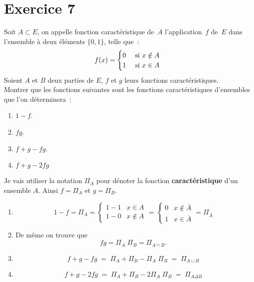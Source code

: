 \documentclass{report}
\begin{document}
\section{Exercice 7}
\qs{}
{

Soit $A\subset E$, on appelle fonction caractéristique de~$A$
l'application~$f$ de~$E$ dans l'ensemble à deux éléments $\{0, 1\}$, telle
que~:
$$f(x)=\begin{cases}
0&  \text{ si } x\notin A \cr 1& \text{ si } x \in A \cr
\end{cases}$$
Soient $A$ et $B$ deux parties de $E$, $f$ et $g$ leurs fonctions
caractéristiques.\\
Montrer que les fonctions suivantes sont les fonctions
caractéristiques d'ensembles que l'on déterminera~:
\begin{enumerate}
\item $1-f$.
\item $fg$.
\item $f+g-fg$.
\item $f + g - 2fg$
\end{enumerate}

}
\begin{myproof}
  
  Je vais utiliser la notation $\varPi_A$ pour dénoter la fonction
  \textbf{caractéristique} d'un ensemble $A$. Ainsi $f=\varPi_A$ et $g=\varPi_B$.
  \begin{enumerate}
      \item 
      $$
     1 - f = \varPi_A = \begin{cases}
      1 - 1 & x \in A   \\
      1 - 0 & x \not\in A
    \end{cases} = 
\begin{cases}
  0 & x \notin \overline{A}   \\
  1  & x \in \overline{A}
\end{cases} = \varPi_{\overline{A}}
      $$
    \item De même on trouve que
      $$
      fg = \varPi_A\;\varPi_B = \varPi_{A\cap B}.
      $$
    \item 
      $$
      f + g - fg\; =\; \varPi_A + \varPi_B - \varPi_A\;\varPi_B\; =\; \varPi_{A \cup B}
      $$
    \item 

      $$
      f + g - 2fg\; =\; \varPi_A + \varPi_B - 2\varPi_A\;\varPi_B\; =\;
      \varPi_{A \Delta B}
      $$
  \end{enumerate}
  
\end{myproof}
\end{document}
